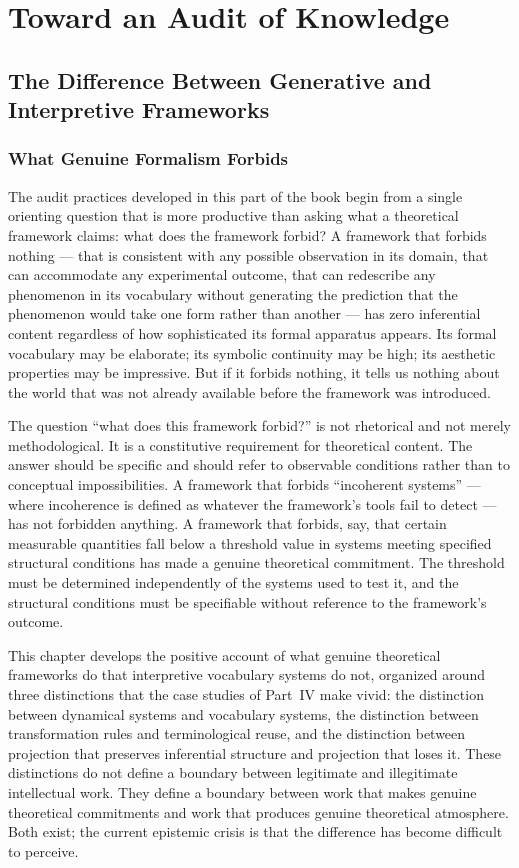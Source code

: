 \documentclass[12pt, openright, twoside]{book}
\begin{document}
\clearpage

\part{Toward an Audit of Knowledge}

\chapter{The Difference Between Generative and Interpretive Frameworks}

\section{What Genuine Formalism Forbids}

The audit practices developed in this part of the book begin from a
single orienting question that is more productive than asking what a
theoretical framework claims: what does the framework forbid? A framework
that forbids nothing --- that is consistent with any possible observation
in its domain, that can accommodate any experimental outcome, that can
redescribe any phenomenon in its vocabulary without generating the prediction
that the phenomenon would take one form rather than another --- has zero
inferential content regardless of how sophisticated its formal apparatus
appears. Its formal vocabulary may be elaborate; its symbolic continuity
may be high; its aesthetic properties may be impressive. But if it forbids
nothing, it tells us nothing about the world that was not already available
before the framework was introduced.

The question ``what does this framework forbid?'' is not rhetorical and
not merely methodological. It is a constitutive requirement for theoretical
content. The answer should be specific and should refer to observable
conditions rather than to conceptual impossibilities. A framework that
forbids ``incoherent systems'' --- where incoherence is defined as whatever
the framework's tools fail to detect --- has not forbidden anything. A
framework that forbids, say, that certain measurable quantities fall below
a threshold value in systems meeting specified structural conditions has
made a genuine theoretical commitment. The threshold must be determined
independently of the systems used to test it, and the structural conditions
must be specifiable without reference to the framework's outcome.

This chapter develops the positive account of what genuine theoretical
frameworks do that interpretive vocabulary systems do not, organized around
three distinctions that the case studies of Part~IV make vivid: the
distinction between dynamical systems and vocabulary systems, the distinction
between transformation rules and terminological reuse, and the distinction
between projection that preserves inferential structure and projection that
loses it. These distinctions do not define a boundary between legitimate and
illegitimate intellectual work. They define a boundary between work that
makes genuine theoretical commitments and work that produces genuine
theoretical atmosphere. Both exist; the current epistemic crisis is that
the difference has become difficult to perceive.
\end{document}
